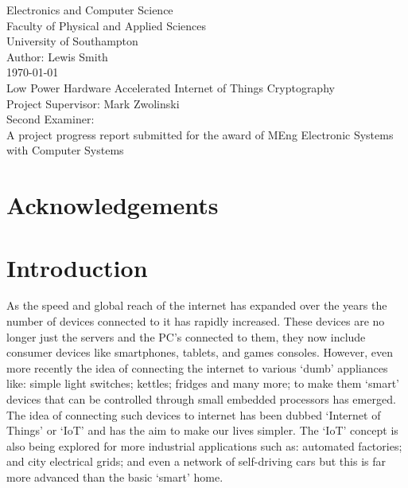 \documentclass[12pt,twoside,a4paper]{report}
\begin{document}
    
	\begin{titlepage}
	\begin{center}
		\Huge
		Electronics and Computer Science
		\\Faculty of Physical and Applied Sciences
		\\University of Southampton
		\Large
		\\[4cm]Author: Lewis Smith
		\\[1cm]\today
		\\[2cm]Low Power Hardware Accelerated Internet of Things Cryptography
		\\[4cm]Project Supervisor: Mark Zwolinski
		\\Second Examiner:
		\\[4cm]A project progress report submitted for the award of MEng Electronic Systems with Computer Systems
        
	\end{center}
	\end{titlepage}
	\thispagestyle{empty}
	\cleardoublepage
    
	\begin{abstract}
    
    
	\end{abstract}
    
	\tableofcontents
    
	\chapter*{Acknowledgements}
    
	\chapter{Introduction}
	\label{chapter:intro}
	As the speed and global reach of the internet has expanded over the years the number of devices connected to it has rapidly increased. These devices are no longer just the servers and the PC's connected to them, they now include consumer devices like smartphones, tablets, and games consoles. However, even more recently the idea of connecting the internet to various `dumb' appliances like: simple light switches; kettles; fridges and many more; to make them `smart' devices that can be controlled through small embedded processors has emerged. The idea of connecting such devices to internet has been dubbed `Internet of Things' or `IoT' and has the aim to make our lives simpler. The `IoT' concept is also being explored for more industrial applications such as: automated factories; and city electrical grids; and even a network of self-driving cars\cite{Hegde} but this is far more advanced than the basic `smart' home.
    
\end{document}
